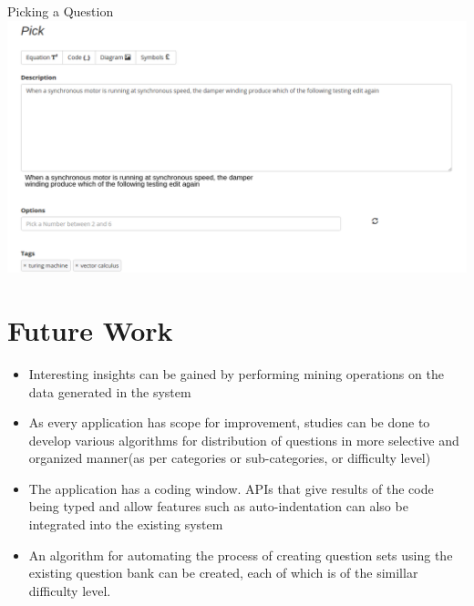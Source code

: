 \documentclass[a4paper,12pt,oneside]{book}
\begin{document}
\vspace{2in}
Picking a Question \\
\includegraphics[scale=0.34]{pick.png}	\\

\vspace{4in}

\section{Future Work}
    \begin{itemize}
        \item Interesting insights can be gained by performing mining operations on the data generated in the system
        
        \item As every application has scope for improvement, studies can be done to develop various algorithms for distribution of questions in more selective and organized manner(as per categories or sub-categories, or difficulty level)
        
        \item The application has a coding window. APIs that give results of the code being typed and allow features such as auto-indentation can also be integrated into the existing system
        
        \item An algorithm for automating the process of creating question sets using the existing question bank can be created, each of which is of the simillar difficulty level.
    \end{itemize}
\end{document}
